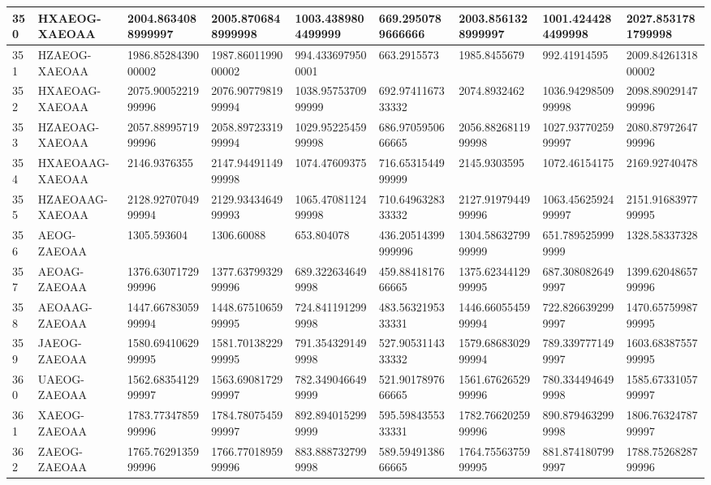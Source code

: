 {\begin{longtable}{|l|l|l|l|l|l|l|l|l|}
        350 & HXAEOG-XAEOAA & 2004.8634088999997 & 2005.8706848999998 & 1003.4389804499999 & 669.2950789666666 & 2003.8561328999997 & 1001.4244284499998 & 2027.8531781799998 \\ \hline
        351 & HZAEOG-XAEOAA & 1986.8528439000002 & 1987.8601199000002 & 994.4336979500001 & 663.2915573 & 1985.8455679 & 992.41914595 & 2009.8426131800002 \\ \hline
        352 & HXAEOAG-XAEOAA & 2075.9005221999996 & 2076.9077981999994 & 1038.9575370999999 & 692.9741167333332 & 2074.8932462 & 1036.9429850999998 & 2098.8902914799996 \\ \hline
        353 & HZAEOAG-XAEOAA & 2057.8899571999996 & 2058.8972331999994 & 1029.9522545999998 & 686.9705950666665 & 2056.8826811999998 & 1027.9377025999997 & 2080.8797264799996 \\ \hline
        354 & HXAEOAAG-XAEOAA & 2146.9376355 & 2147.9449114999998 & 1074.47609375 & 716.6531544999999 & 2145.9303595 & 1072.46154175 & 2169.92740478 \\ \hline
        355 & HZAEOAAG-XAEOAA & 2128.9270704999994 & 2129.9343464999993 & 1065.4708112499998 & 710.6496328333332 & 2127.9197944999996 & 1063.4562592499997 & 2151.9168397799995 \\ \hline
        356 & AEOG-ZAEOAA & 1305.593604 & 1306.60088 & 653.804078 & 436.20514399999996 & 1304.5863279999999 & 651.7895259999999 & 1328.58337328 \\ \hline
        357 & AEOAG-ZAEOAA & 1376.6307172999996 & 1377.6379932999996 & 689.3226346499998 & 459.8841817666665 & 1375.6234412999995 & 687.3080826499997 & 1399.6204865799996 \\ \hline
        358 & AEOAAG-ZAEOAA & 1447.6678305999994 & 1448.6751065999995 & 724.8411912999998 & 483.5632195333331 & 1446.6605545999994 & 722.8266392999997 & 1470.6575998799995 \\ \hline
        359 & JAEOG-ZAEOAA & 1580.6941062999995 & 1581.7013822999995 & 791.3543291499998 & 527.9053114333332 & 1579.6868302999994 & 789.3397771499997 & 1603.6838755799995 \\ \hline
        360 & UAEOG-ZAEOAA & 1562.6835412999997 & 1563.6908172999997 & 782.3490466499999 & 521.9017897666665 & 1561.6762652999996 & 780.3344946499998 & 1585.6733105799997 \\ \hline
        361 & XAEOG-ZAEOAA & 1783.7734785999996 & 1784.7807545999997 & 892.8940152999999 & 595.5984355333331 & 1782.7662025999996 & 890.8794632999998 & 1806.7632478799997 \\ \hline
        362 & ZAEOG-ZAEOAA & 1765.7629135999996 & 1766.7701895999996 & 883.8887327999998 & 589.5949138666665 & 1764.7556375999995 & 881.8741807999997 & 1788.7526828799996 \\ \hline

\end{longtable}}
